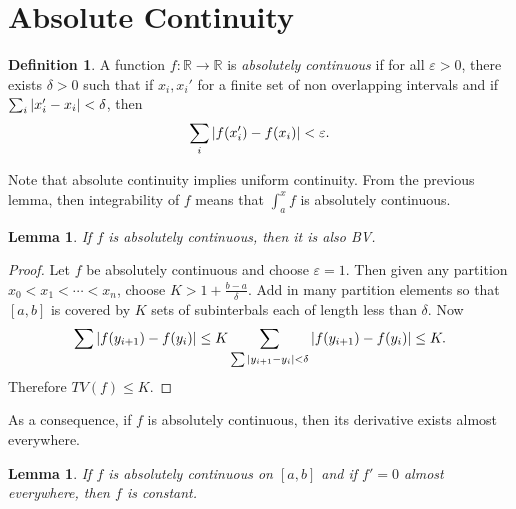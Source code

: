 \documentclass[leqno, openany]{memoir}
\newtheorem{lem}[thm]{Lemma}
\theoremstyle{definition}
\newtheorem{defn}[thm]{Definition}
\theoremstyle{remark}
\theoremstyle{plain}
\theoremstyle{definition}
\theoremstyle{remark}
\newcommand{\R}{\mathbb{R}}
\newcommand{\ep}{\varepsilon}
\begin{document}
\section{Absolute Continuity}%

\begin{defn} A function $f: \R \to \R$ is \textit{absolutely continuous} if for
    all $\ep > 0$, there exists $\delta > 0$ such that if $x_i,x_i'$ for a
    finite set of non overlapping intervals and if $\sum_i \abs{x_i' - x_i} <
    \delta$, then \[ \sum_i \abs{f(x_i') - f(x_i)} < \ep. \] \end{defn}

Note that absolute continuity implies uniform continuity. From the previous
lemma, then integrability of $f$ means that $\int_a^x f$ is absolutely
continuous.

\begin{lem} If $f$ is absolutely continuous, then it is also BV.  \end{lem}

\begin{proof} Let $f$ be absolutely continuous and choose $\ep = 1$. Then given
    any partition $x_0 < x_1 < \cdots < x_n$, choose $K > 1 + \frac{b -
    a}{\delta}$. Add in many partition elements so that $[a,b]$ is covered by
    $K$ sets of subinterbals each of length less than $\delta$. Now \[ \sum
    \abs{f(y_{i+1}) - f(y_i)} \leq K \sum_{\sum \abs{y_{i+1} - y_i} < \delta}
\abs{f(y_{i+1}) - f(y_i)} \leq K. \] Therefore $TV(f) \leq K$.  \end{proof}

As a consequence, if $f$ is absolutely continuous, then its derivative exists
almost everywhere.

\begin{lem} If $f$ is absolutely continuous on $[a,b]$ and if $f' = 0$ almost
everywhere, then $f$ is constant.  \end{lem}
\end{document}
